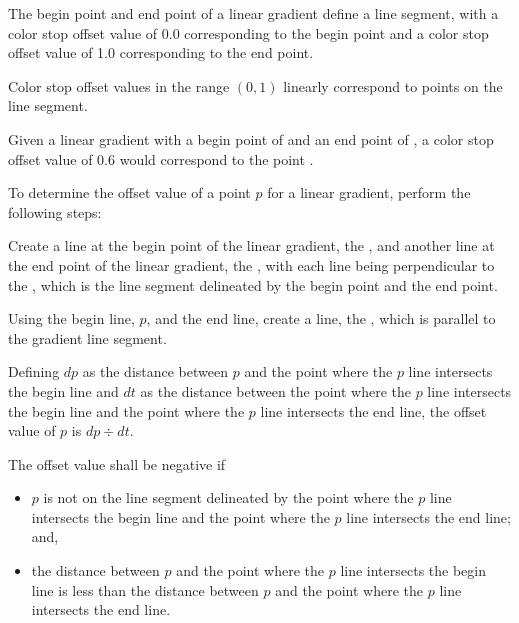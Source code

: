 \pnum
The begin point and end point of a linear gradient define a line segment, with a color stop offset value of 0.0 corresponding to the begin point and a color stop offset value of 1.0 corresponding to the end point.

\pnum
Color stop offset values in the range $(0,1)$ linearly correspond to points on the line segment.

\pnum
\enterexample
Given a linear gradient with a begin point of  and an end point of , a color stop offset value of 0.6 would correspond to the point .
\exitexample

\pnum
To determine the offset value of a point $p$ for a linear gradient, perform the following steps:
\begin{enumeratea}
\item Create a line at the begin point of the linear gradient, the , and another line at the end point of the linear gradient, the , with each line being perpendicular to the , which is the line segment delineated by the begin point and the end point.

\item Using the begin line, $p$, and the end line, create a line, the , which is parallel to the gradient line segment.

\item Defining $dp$ as the distance between $p$ and the point where the $p$ line intersects the begin line and $dt$ as the distance between the point where the $p$ line intersects the begin line and the point where the $p$ line intersects the end line, the offset value of $p$ is $dp \div dt$.

\item The offset value shall be negative if
\begin{itemize}
\item $p$ is not on the line segment delineated by the point where the $p$ line intersects the begin line and the point where the $p$ line intersects the end line; and,

\item the distance between $p$ and the point where the $p$ line intersects the begin line is less than the distance between $p$ and the point where the $p$ line intersects the end line.
\end{itemize}
\end{enumeratea}

